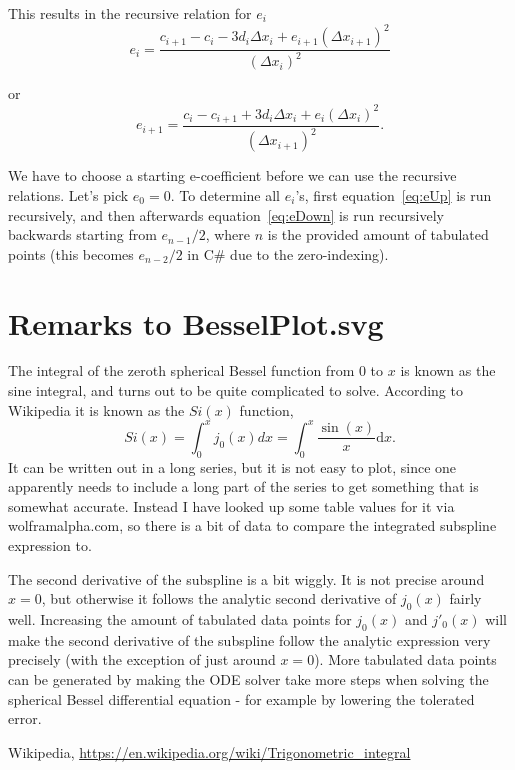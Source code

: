 \documentclass[twocolumn]{article}
\begin{document}
This results in the recursive relation for $e_i$
\begin{equation}\label{eq:eDown}
e_i = \frac{c_{i+1}-c_i - 3d_i\Delta x_i + e_{i+1}(\Delta x_{i+1})^2}{(\Delta x_i)^2}
\end{equation}

or
\begin{equation}\label{eq:eUp}
e_{i+1} = \frac{c_i - c_{i+1} + 3d_i\Delta x_i + e_i(\Delta x_i)^2}{(\Delta x_{i+1})^2}.
\end{equation}

We have to choose a starting e-coefficient before we can use the recursive relations. Let's pick $e_0 = 0$. To determine all $e_i$'s, first equation~\ref{eq:eUp} is run recursively, and then afterwards equation~\ref{eq:eDown} is run recursively backwards starting from $e_{n-1}/2$, where $n$ is the provided amount of tabulated points (this becomes $e_{n-2}/2$ in C\# due to the zero-indexing). 

\section{Remarks to BesselPlot.svg}

The integral of the zeroth spherical Bessel function from $0$ to $x$ is known as the sine integral, and turns out to be quite complicated to solve. According to Wikipedia\cite{wiki} it is known as the $Si(x)$ function,
\begin{equation}
Si(x) = \int_0^x j_0(x) dx = \int_0^x \frac{\sin(x)}{x} \mathrm{d}x.
\end{equation}
It can be written out in a long series, but it is not easy to plot, since one apparently needs to include
a long part of the series to get something that is somewhat accurate. Instead I have looked up some
table values for it via wolframalpha.com, so there is a bit of data to compare the integrated subspline expression to.

\medskip

The second derivative of the subspline is a bit wiggly. It is not precise around $x = 0$, but otherwise it follows the analytic second derivative of $j_0(x)$ fairly well. Increasing the amount of tabulated data points for $j_0(x)$ and $j'_0(x)$ will make the second derivative of the subspline follow the analytic expression very precisely (with the exception of just around $x = 0$). More tabulated data points can be generated by making the ODE solver take more steps when solving the spherical Bessel differential equation - for example by lowering the tolerated error.


\begin{thebibliography}{9}
Wikipedia,
\url{https://en.wikipedia.org/wiki/Trigonometric\_integral}
\end{thebibliography}
\end{document}
